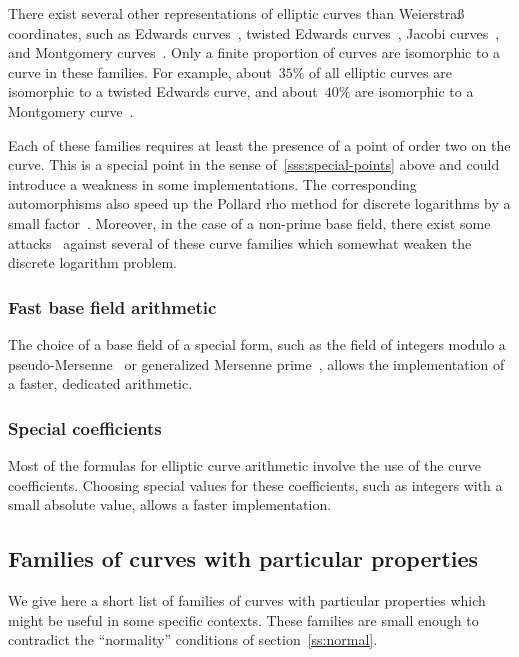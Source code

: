 \documentclass[twocolumn,letterpaper,10pt]{article}
\begin{document}
There exist several other representations of elliptic curves
than Weierstraß coordinates, such as
Edwards curves~\cite{ams2007edwards},
twisted Edwards curves~\cite{africa2008bbjl},
Jacobi curves~\cite{aaaaec2003bj},
and Montgomery curves~\cite{mathcomp1987montgomery}.
Only a finite proportion of curves are isomorphic
to a curve in these families.
For example, about~$35\%$ of all elliptic curves
are isomorphic to a twisted Edwards curve,
and about~$40\%$ are isomorphic to a Montgomery curve~\cite{sac2011plut}.

Each of these families requires at least
the presence of a point of order two on the curve.
This is a special point in the sense of~\ref{sss:special-points} above
and could introduce a weakness in some implementations.
The corresponding automorphisms also speed up the Pollard rho
method for discrete logarithms by a small factor~\cite{moc2000glv}.
Moreover, in the case of a non-prime base field,
there exist some attacks~\cite{jc2014fghr}
against several of these curve families
which somewhat weaken the discrete logarithm problem.

\subsubsection{Fast base field arithmetic}
\label{sss:special-fast}

The choice of a base field of a special form,
such as the field of integers modulo
a pseudo-Mersenne~\cite{pkc2006bernstein}
or generalized Mersenne prime~\cite{nist2000fips186-2},
allows the implementation of a faster, dedicated arithmetic.

\subsubsection{Special coefficients}

Most of the formulas for elliptic curve arithmetic
involve the use of the curve coefficients.
Choosing special values for these coefficients,
such as integers with a small absolute value,
allows a faster implementation.

\subsection{Families of curves with particular properties}
\label{ss:particular}

We give here a short list of families of curves
with particular properties which might be useful in some specific contexts.
These families are small enough
to contradict the ``normality'' conditions of section~\ref{ss:normal}.
\end{document}
